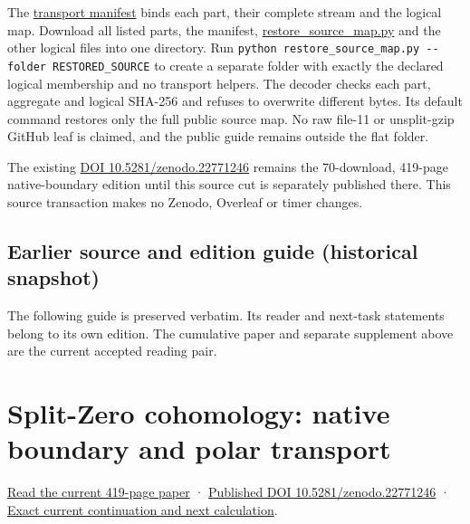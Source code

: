 \documentclass[
]{article}
\begin{document}
The
\href{https://github.com/KokunoYumeto/zeta-function-research-reader/blob/main/workbenches/splitzero-tandem/continuations/20260915-native-conductor-continuation/SOURCE_MAP_TRANSPORT.json}{transport
manifest} binds each part, their complete stream and the logical map.
Download all listed parts, the manifest,
\href{https://github.com/KokunoYumeto/zeta-function-research-reader/blob/main/workbenches/splitzero-tandem/continuations/20260915-native-conductor-continuation/restore_source_map.py}{restore\_source\_map.py}
and the other logical files into one directory. Run
\texttt{python\ restore\_source\_map.py\ -\/-folder\ RESTORED\_SOURCE}
to create a separate folder with exactly the declared logical membership
and no transport helpers. The decoder checks each part, aggregate and
logical SHA-256 and refuses to overwrite different bytes. Its default
command restores only the full public source map. No raw file-11 or
unsplit-gzip GitHub leaf is claimed, and the public guide remains
outside the flat folder.

The existing \href{https://doi.org/10.5281/zenodo.22771246}{DOI
10.5281/zenodo.22771246} remains the 70-download, 419-page
native-boundary edition until this source cut is separately published
there. This source transaction makes no Zenodo, Overleaf or timer
changes.

\subsection{Earlier source and edition guide (historical
snapshot)}\label{earlier-source-and-edition-guide-historical-snapshot-1}

The following guide is preserved verbatim. Its reader and next-task
statements belong to its own edition. The cumulative paper and separate
supplement above are the current accepted reading pair.

\section{Split-Zero cohomology: native boundary and polar
transport}\label{split-zero-cohomology-native-boundary-and-polar-transport}

\href{https://zenodo.org/api/records/22771246/files/69-native-boundary-reader.pdf/content}{Read
the current 419-page paper} ·
\href{https://doi.org/10.5281/zenodo.22771246}{Published DOI
10.5281/zenodo.22771246} ·
\href{https://github.com/KokunoYumeto/zeta-function-research-reader/blob/0512b18d5479f3abc24ae654f8ffee4e5d53922e/workbenches/splitzero-tandem/continuations/20260915-native-boundary-continuation/00_CONTINUE_HERE.md}{Exact
current continuation and next calculation}.
\end{document}
